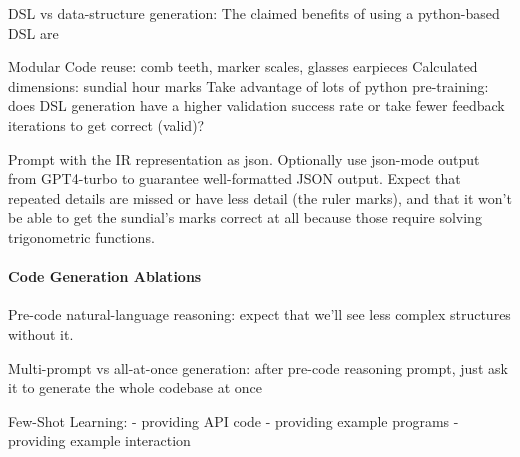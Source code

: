 DSL vs data-structure generation:
The claimed benefits of using a python-based DSL are

Modular Code reuse: comb teeth, marker scales, glasses earpieces
Calculated dimensions: sundial hour marks
Take advantage of lots of python pre-training: does DSL generation have a higher validation success rate or take fewer feedback iterations to get correct (valid)?


Prompt with the IR representation as json. Optionally use json-mode output from GPT4-turbo to guarantee well-formatted JSON output. Expect that repeated details are missed or have less detail (the ruler marks), and that it won't be able to get the sundial's marks correct at all because those require solving trigonometric functions.

\paragraph{Code Generation Ablations}

Pre-code natural-language reasoning: expect that we'll see less complex structures without it.

Multi-prompt vs all-at-once generation: after pre-code reasoning prompt, just ask it to generate the whole codebase at once

Few-Shot Learning:
 - providing API code
 - providing example programs
 - providing example interaction


\fi
